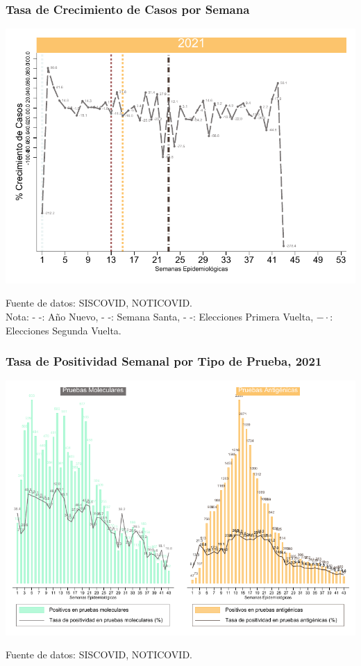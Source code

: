 \documentclass[xcolor=table]{beamer}
\begin{document}
	\begin{frame}
		\frametitle{Tasa de Crecimiento de Casos por Semana}
		\vspace{-.5cm}
		\begin{center}
			\includegraphics[width=0.9\linewidth]{../figuras/positivos_crecimiento_2021.pdf}
		\end{center} 
		{\tiny Fuente de datos: SISCOVID, NOTICOVID. \\
	Nota:{\color{mycolor1} - -: Año Nuevo}, {\color{mycolor2} - -: Semana Santa}, {\color{mycolor3} - -: Elecciones Primera Vuelta}, {\color{mycolor4} $- \cdot$: Elecciones Segunda Vuelta}. \\}
	\end{frame}
	
	\begin{frame}
		\frametitle{Tasa de Positividad Semanal por Tipo de Prueba, 2021}
		\vspace{-.5cm}
		\begin{center}
			\includegraphics[width=0.9\linewidth]{../figuras/positividad_ambas.pdf}
		\end{center}
		{\tiny Fuente de datos: SISCOVID, NOTICOVID.}
	\end{frame}
\end{document}
